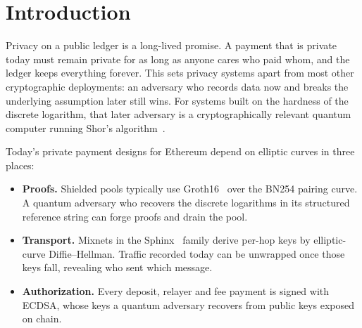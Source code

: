\documentclass[11pt,a4paper]{article}
\begin{document}
\section{Introduction}

Privacy on a public ledger is a long-lived promise. A payment that is private today must remain private
for as long as anyone cares who paid whom, and the ledger keeps everything forever. This sets privacy
systems apart from most other cryptographic deployments: an adversary who records data now and breaks
the underlying assumption later still wins. For systems built on the hardness of the discrete logarithm,
that later adversary is a cryptographically relevant quantum computer running Shor's
algorithm~\cite{shor}.

Today's private payment designs for Ethereum depend on elliptic curves in three places:
\begin{itemize}
  \item \textbf{Proofs.} Shielded pools typically use Groth16~\cite{groth16} over the BN254 pairing curve.
    A quantum adversary who recovers the discrete logarithms in its structured reference string can
    forge proofs and drain the pool.
  \item \textbf{Transport.} Mixnets in the Sphinx~\cite{sphinx} family derive per-hop keys by
    elliptic-curve Diffie--Hellman. Traffic recorded today can be unwrapped once those keys fall,
    revealing who sent which message.
  \item \textbf{Authorization.} Every deposit, relayer and fee payment is signed with ECDSA, whose keys a
    quantum adversary recovers from public keys exposed on chain.
\end{itemize}
\end{document}
